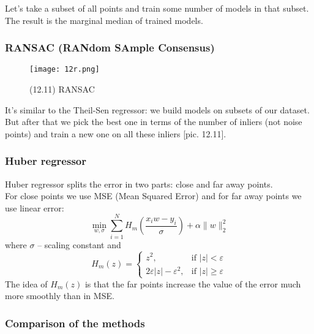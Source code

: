 Let's take a subset of all points and train some number of models in that subset. The result is the marginal median of trained models.

\newpage
\subsubsection*{RANSAC (RANdom SAmple Consensus)}

\begin{wrapfigure}{r}{0.26\linewidth}
	\vspace{-2cm}
  \begin{center}
    \texttt{[image: 12r.png]}
  \end{center}
  \vspace{-0.6cm}
  \caption*{(12.11) RANSAC}
  \vspace{-1cm}
\end{wrapfigure}
It's similar to the Theil-Sen regressor: we build models on subsets of our dataset. But after that we pick the best one in terms of the number of inliers (not noise points) and train a new one on all these inliers [pic. 12.11].

\subsubsection*{Huber regressor} 

Huber regressor splits the error in two parts: close and far away points. \\
For close points we use MSE (Mean Squared Error) and for far away points we use linear error:
$$\min\limits_{w,\sigma}\sum\limits_{i=1}^{N}H_{m}\left(\frac{x_iw-y_i}{\sigma}\right)+\alpha\|w\|_2^2$$
where $\sigma$ -- scaling constant and 
$$H_m(z)=\begin{cases}
	z^2, & \text{if } |z|<\varepsilon \\
	2\varepsilon|z|-\varepsilon^2, & \text{if } |z|\ge\varepsilon
\end{cases}$$
The idea of $H_m(z)$ is that the far points increase the value of the error much more smoothly than in MSE.

\subsubsection*{Comparison of the methods}

